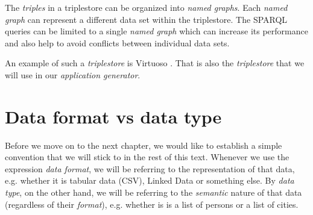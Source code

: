 The \emph{triples} in a triplestore can be organized into \emph{named graphs}. Each \emph{named graph} can represent a different data set within the triplestore. The SPARQL queries can be limited to a single \emph{named graph} which can increase its performance and also help to avoid conflicts between individual data sets.

An example of such a \emph{triplestore} is Virtuoso \cite{virtuoso}. That is also the \emph{triplestore} that we will use in our \emph{application generator}.

\section{Data format vs data type}

Before we move on to the next chapter, we would like to establish a simple convention that we will stick to in the rest of this text. Whenever we use the expression \emph{data format}, we will be referring to the representation of that data, e.g. whether it is tabular data (CSV), Linked Data or something else. By \emph{data type}, on the other hand, we will be referring to the \emph{semantic} nature of that data (regardless of their \emph{format}), e.g. whether is is a list of persons or a list of cities.